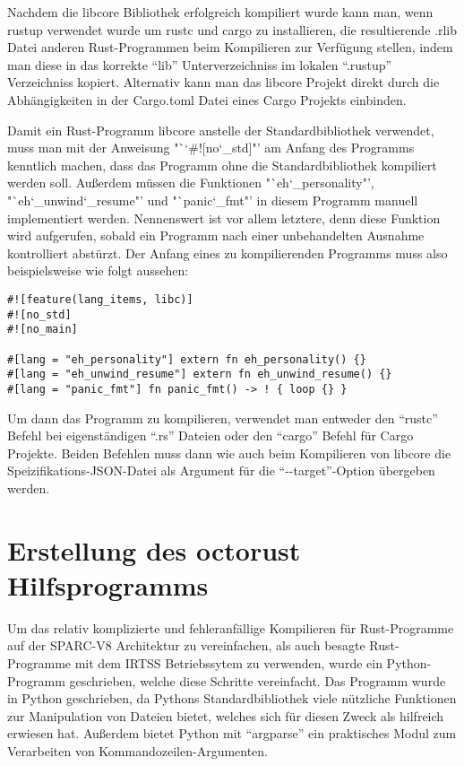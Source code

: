 Nachdem die libcore Bibliothek erfolgreich kompiliert wurde kann man, wenn rustup verwendet wurde um rustc und cargo zu installieren, 
die resultierende .rlib Datei anderen Rust-Programmen beim Kompilieren zur Verfügung stellen,
indem man diese in das korrekte "`lib"' Unterverzeichniss im lokalen "`.rustup"' Verzeichniss kopiert.
Alternativ kann man das libcore Projekt direkt durch die Abhängigkeiten in der Cargo.toml Datei
eines Cargo Projekts einbinden.

Damit ein Rust-Programm libcore anstelle der Standardbibliothek verwendet, muss man mit der Anweisung "`\char`#![no\char`_std]"'
am Anfang des Programms kenntlich machen, dass das Programm ohne die Standardbibliothek kompiliert werden soll.
Außerdem müssen die Funktionen "`eh\char`_personality"', "`eh\char`_unwind\char`_resume"' und
"`panic\char`_fmt"' in diesem Programm manuell implementiert werden. Nennenswert ist vor allem letztere, denn diese Funktion
wird aufgerufen, sobald ein Programm nach einer unbehandelten Ausnahme kontrolliert abstürzt.
Der Anfang eines zu kompilierenden Programms muss also beispielsweise wie folgt aussehen:
\begin{verbatim}
#![feature(lang_items, libc)]
#![no_std]
#![no_main]

#[lang = "eh_personality"] extern fn eh_personality() {}
#[lang = "eh_unwind_resume"] extern fn eh_unwind_resume() {}
#[lang = "panic_fmt"] fn panic_fmt() -> ! { loop {} }
\end{verbatim}

Um dann das Programm zu kompilieren, verwendet man entweder den "`rustc"' Befehl bei eigenständigen "`.rs"' Dateien oder den
"`cargo"' Befehl für Cargo Projekte. Beiden Befehlen muss dann wie auch beim Kompilieren von libcore die Speizifikations-JSON-Datei
als Argument für die "`-{}-target"'-Option übergeben werden. 

\section{Erstellung des octorust Hilfsprogramms}

Um das relativ komplizierte und fehleranfällige Kompilieren für Rust-Programme auf der SPARC-V8 Architektur zu vereinfachen, als
auch besagte Rust-Programme mit dem IRTSS Betriebssytem zu verwenden, wurde ein Python-Programm geschrieben, welche diese Schritte
vereinfacht. Das Programm wurde in Python geschrieben, da Pythons Standardbibliothek viele nützliche Funktionen zur Manipulation
von Dateien bietet, welches sich für diesen Zweck als hilfreich erwiesen hat. Außerdem bietet Python mit "`argparse"' ein
praktisches Modul zum Verarbeiten von Kommandozeilen-Argumenten.

